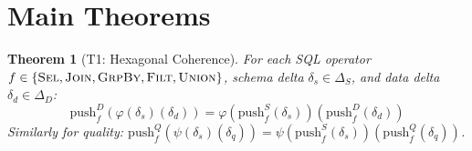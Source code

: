 \documentclass[11pt,a4paper]{article}
\newtheorem{theorem}{Theorem}[section]
\theoremstyle{definition}
\newcommand{\DeltaS}{\Delta_{\!S}}
\newcommand{\DeltaD}{\Delta_{\!D}}
\newcommand{\push}{\mathrm{push}}
\begin{document}
\section{Main Theorems}
\label{sec:theorems}

\begin{theorem}[T1: Hexagonal Coherence]\label{thm:hexagonal}
For each SQL operator $f \in \{\textsc{Sel}, \textsc{Join}, \textsc{GrpBy},
\textsc{Filt}, \textsc{Union}\}$, schema delta $\delta_s \in \DeltaS$, and
data delta $\delta_d \in \DeltaD$:
\begin{equation}\label{eq:hexagonal-data}
\push_f^D(\varphi(\delta_s)(\delta_d)) =
\varphi(\push_f^S(\delta_s))(\push_f^D(\delta_d))
\end{equation}
Similarly for quality:
$\push_f^Q(\psi(\delta_s)(\delta_q)) =
 \psi(\push_f^S(\delta_s))(\push_f^Q(\delta_q))$.
\end{theorem}
\end{document}
